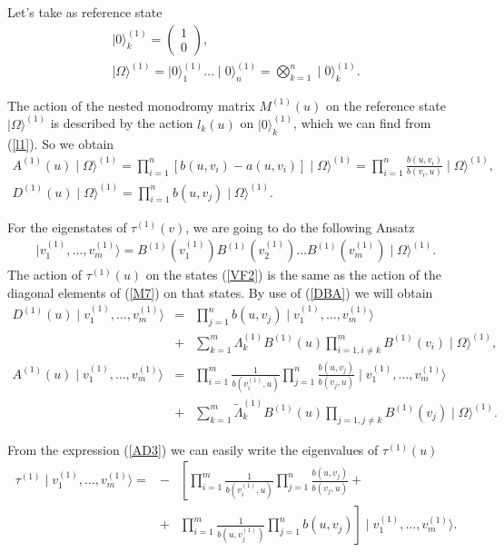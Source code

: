 \documentclass[a4paper,12pt]{article}
\newcommand{\nn}{\nonumber}
\begin{document}
Let's take as reference state 
\begin{eqnarray}
\label{O2}
\mid 0\rangle_{k}^{(1)} =\left(
\begin{array}{l}
1\\
0
\end{array}
\right),\;\;\nn\\
\mid\Omega\rangle^{(1)}=\mid 0\rangle_1 ^{(1)}
\dots\mid 0\rangle_n ^{(1)}=\bigotimes_{k=1}^n\mid 0\rangle_k ^{(1)}.
\end{eqnarray}

The action of the nested monodromy matrix $M^{(1)} (u)$ on the 
reference state $\mid\Omega\rangle^{(1)}$ is described by the action $l_k (u)$ 
on $\mid 0\rangle_k ^{(1)}$, which we can find from (\ref{l1}). So we
obtain
\begin{eqnarray}
\label{AD2}
A^{(1)}(u)\mid\Omega\rangle^{(1)}=\prod_{i=1}^n [b(u,v_i )-a(u,v_i )]
\mid\Omega\rangle^{(1)}=\prod_{i=1}^{n}\frac{b(u,v_i )}{b(v_i ,u)}\mid\Omega
\rangle^{(1)},\nn\\
D^{(1)}(u)\mid\Omega\rangle^{(1)}=\prod_{i=1}^n b(u,v_j )\mid\Omega
\rangle^{(1)}.
\end{eqnarray}

For the eigenstates of $\tau^{(1)}(v)$, we are going to do the following 
Ansatz
\begin{eqnarray}
\label{VF2}
\mid v_{1}^{(1)},\dots,v_m^{(1)}\rangle=B^{(1)}(v_1 ^{(1)})B^{(1)}(v_2 ^{(1)})
\dots B^{(1)}(v_m ^{(1)})\mid\Omega\rangle^{(1)}.
\end{eqnarray}
The action of $\tau^{(1)}(u)$ on the states (\ref{VF2}) is the same 
as the action of the diagonal elements of (\ref{M7}) on that states.
By use of (\ref{DBA}) we will obtain
\begin{eqnarray}
\label{AD3}
D^{(1)}(u)\mid v_1^{(1)},\dots ,v_m^{(1)}\rangle 
&=&\prod_{j=1}^n b(u,v_j)\mid 
v_1^{(1)},\dots ,v_m^{(1)}\rangle \nn\\
&+&\sum_{k=1}^m\Lambda_k^{(1)}B^{(1)}(u)
\prod_{i=1,i\neq k}^mB^{(1)}(v_i)\mid\Omega\rangle^{(1)},\nn\\
A^{(1)}(u)\mid v_1^{(1)},\dots ,v_m^{(1)}\rangle
&=& \prod_{i=1}^{m}\frac{1}{b(v_i^{(1)},u)}
\prod_{j=1}^n\frac{b(u,v_j)}{b(v_j,u)}
\mid v_1^{(1)},\dots ,v_m^{(1)}\rangle\nn\\
&+&\sum_{k=1}^m\tilde{\Lambda}_k^{(1)}B^{(1)}(u)\prod_{j=1,j\neq k}
B^{(1)}(v_j) \mid\Omega\rangle^{(1)}.
\end{eqnarray}

{}From the expression (\ref{AD3}) we can easily write the eigenvalues 
of $\tau^{(1)}(u)$
\begin{eqnarray}
\label{tt}
\tau^{(1)}\mid v_1^{(1)},\dots ,v_m^{(1)}\rangle=&-&\left[
\prod_{i=1}^m\frac{1}{b(v_i^{(1)},u)}
\prod_{j=1}^n\frac{b(u,v_j)}{b(v_j,u)}+\right.\nn\\
&+&\left.\prod_{i=1}^m\frac{1}{b(u,v_j^{(1)})}\prod_{j=1}^nb(u,v_j)\right]\mid 
v_1^{(1)},\dots ,v_m^{(1)}\rangle.
\end{eqnarray}
\end{document}
